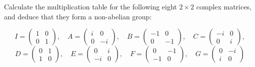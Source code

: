 \begin{exercise}
    Calculate the multiplication table for the following eight \(2 \times 2\) complex matrices, and deduce that they form a non-abelian group:

    \[
        I=\left(\begin{array}{rr}
                1 & 0 \\
                0 & 1
            \end{array}\right), \quad
        A=\left(\begin{array}{rr}
                i & 0  \\
                0 & -i
            \end{array}\right), \quad
        B=\left(\begin{array}{rr}
                - 1 & 0  \\
                0   & -1
            \end{array}\right), \quad
        C=\left(\begin{array}{rr}
                -i & 0 \\
                0  & i
            \end{array}\right), \]
    \[ D =\left(\begin{array}{rr}
                0 & 1 \\
                1 & 0
            \end{array}\right), \quad
        E =\left(\begin{array}{rr}
                0  & i \\
                -i & 0
            \end{array}\right), \quad
        F=\left(\begin{array}{rr}
                0  & -1 \\
                -1 & 0
            \end{array}\right), \quad
        G=\left(\begin{array}{rr}
                0 & -i \\
                i & 0
            \end{array}\right) \]
    \label{ex12}
\end{exercise}


